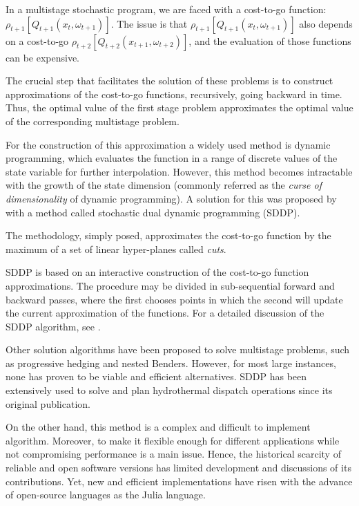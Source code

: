 \documentclass{juliacon}
\begin{document}
In a multistage stochastic program, we are faced with a cost-to-go function: $\rho_{t+1}[Q_{t+1}(x_{t}, \omega_{t+1})]$. The issue is that $\rho_{t+1}[Q_{t+1}(x_{t}, \omega_{t+1})]$ also depends on a cost-to-go $\rho_{t+2}[Q_{t+2}(x_{t+1}, \omega_{t+2})]$, and the evaluation of those functions can be expensive.

The crucial step that facilitates the solution of these problems is to construct approximations of the cost-to-go functions, recursively, going backward in time. Thus, the optimal value of the first stage problem approximates the optimal value of the corresponding multistage problem.

For the construction of this approximation a widely used method is dynamic programming, which evaluates the function in a range of discrete values of the state variable for further interpolation. However, this method becomes intractable with the growth of the state dimension (commonly referred as the \textit{curse of dimensionality} of dynamic programming). A solution for this was proposed by \cite{pereira1991multi} with a method called stochastic dual dynamic programming (SDDP).

The methodology, simply posed, approximates the cost-to-go function by the maximum of a set of linear hyper-planes called \textit{cuts}.

SDDP is based on an interactive construction of the cost-to-go function approximations. The procedure may be divided in sub-sequential forward and backward passes, where the first chooses points in which the second will update the current approximation of the functions. For a detailed discussion of the SDDP algorithm, see \cite{pereira1991multi,dowson_sddp.jl}.

Other solution algorithms have been proposed to solve multistage problems, such as progressive hedging and nested Benders. However, for most large instances, none has proven to be viable and efficient alternatives. SDDP has been extensively used to solve and plan hydrothermal dispatch operations since its original publication.  

On the other hand, this method is a complex and difficult to implement algorithm. Moreover, to make it flexible enough for different applications while not compromising performance is a main issue. Hence, the historical scarcity of reliable and open software versions has limited development and discussions of its contributions. Yet, new and efficient implementations have risen with the advance of open-source languages as the Julia language.  
\end{document}
